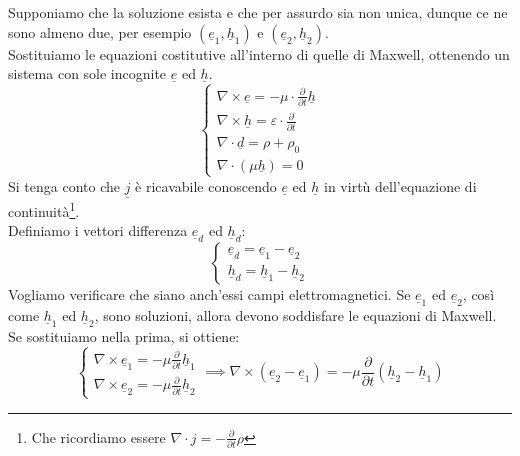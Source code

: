 \documentclass{book}
\begin{document}
        Supponiamo che la soluzione esista e che per assurdo sia non unica, dunque ce ne sono almeno due, per esempio $(\underline{e}_{1}, \underline{h}_{1})$ e $(\underline{e}_{2}, \underline{h}_{2})$. \\
        Sostituiamo le equazioni costitutive all'interno di quelle di Maxwell, ottenendo un sistema con sole incognite $\underline{e}$ ed $\underline{h}$.
        \begin{equation}
            \begin{cases}
            \nabla \times \underline{e} = - \displaystyle \mu \cdot \frac{\partial}{\partial t} \underline{h} \\
            \nabla \times \underline{h} = \displaystyle \varepsilon \cdot \frac{\partial}{\partial t} \\
            \nabla \cdot \underline{d} = \rho + \rho_{0} \\
            \nabla \cdot (\mu \underline{h}) =0
            \end{cases}
        \end{equation}
        Si tenga conto che $\underline{j}$ è ricavabile conoscendo $\underline{e}$ ed $\underline{h}$ in virtù dell'equazione di continuità\footnote{Che ricordiamo essere $\nabla \cdot j = - \displaystyle \frac{\partial}{\partial t}\rho $}.\\
        Definiamo i vettori differenza $\underline{e}_{d}$ ed $\underline{h}_{d}$:
        \begin{equation}
            \begin{cases}
                \underline{e}_{d} = \underline{e}_{1}-\underline{e}_{2} \\
                \underline{h}_{d} = \underline{h}_{1} - \underline{h}_{2}
            \end{cases}
        \end{equation}
        Vogliamo verificare che siano anch'essi campi elettromagnetici. Se $\underline{e}_{1}$ ed $\underline{e}_{2}$, così come $\underline{h}_{1}$ ed $\underline{h}_{2}$, sono soluzioni, allora devono soddisfare le equazioni di Maxwell. Se sostituiamo nella prima, si ottiene:
        \begin{equation}
        \begin{cases}
            \nabla \times \underline{e}_{1} = -  \displaystyle \mu \frac{\partial}{\partial t} \underline{h}_{1} \\
            \nabla \times \underline{e}_{2} = - \mu \frac{\partial}{\partial t} \underline{h}_{2}
        \end{cases} \implies \nabla \times (\underline{e}_{2}-\underline{e}_{1}) = - \mu \frac{\partial}{\partial t}(\underline{h}_{2}-\underline{h}_{1})
        \end{equation}
\end{document}
